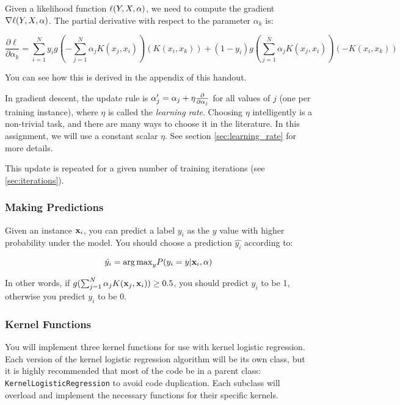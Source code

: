 \documentclass[11pt]{article}
\newcommand{\va}{{\bf \alpha}}
\newcommand{\vx}{{\bf x}}
\newcommand{\vxi}{{\bf x}_i}
\newcommand{\yi}{y_i}
\newcommand{\code}[1]{{\footnotesize \tt #1}}
\newcommand{\pder}[2][]{\frac{\partial#1}{\partial#2}}
\begin{document}
Given a likelihood function $\ell(Y,X,\va)$, we need to compute the gradient $\nabla \ell(Y,X,\va)$. The partial derivative with respect to the parameter $\alpha_k$ is:

\begin{equation}
\pder[\ell]{\alpha_k} = \sum_{i=1}^{N} y_i g\left(-\textstyle \sum_{j=1}^{N} \alpha_j K(x_j, x_i)\right) \left(K(x_i, x_k)\right) 
+ (1 - y_i) g\left(\textstyle \sum_{j=1}^{N} \alpha_j K(x_j, x_i)\right) \left(-K(x_i, x_k)\right) 
\end{equation}

\noindent You can see how this is derived in the appendix of this handout.

In gradient descent, the update rule is $\va'_j = \va_j + \eta \pder{\va_j}$ for all values of $j$ (one per training instance), where $\eta$ is called the {\em learning rate}. Choosing $\eta$ intelligently is a non-trivial task, and there are many ways to choose it in the literature. In this assignment, we will use a constant scalar $\eta$. See section \ref{sec:learning_rate} for more details. 

This update is repeated for a given number of training iterations (see \ref{sec:iterations}).

\subsubsection{Making Predictions}

Given an instance $\vxi$, you can predict a label $\yi$ as the $y$ value with higher probability under the model. You should choose a prediction $\hat{\yi}$ according to:

\begin{equation}
\hat{\yi} = {\arg\max}_{y} P(y_i = y | \vxi, \va)
\end{equation}

In other words, if $g(\sum_{j=1}^N \alpha_j  K(\vx_j, \vx_i)) \ge 0.5$, you should predict $\yi$ to be 1, otherwise you predict $\yi$ to be 0.


\subsubsection{Kernel Functions}

You will implement three kernel functions for use with kernel logistic regression. Each version of the kernel logistic regression algorithm will be its own class, but it is highly recommended that most of the code be in a parent class: \code{KernelLogisticRegression} to avoid code duplication. Each subclass will overload and implement the necessary functions for their specific kernels.
\end{document}
